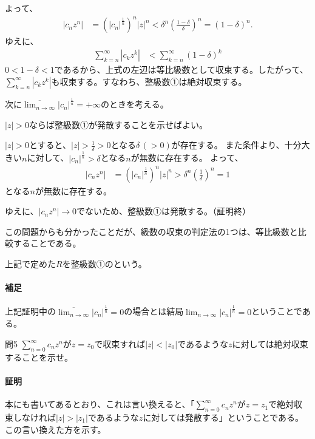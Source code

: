 よって、
\begin{align*}
    |c_nz^n|&=\left(|c_n|^\frac{1}{n}\right)^n|z|^n<\delta^n\left(\frac{1-\delta}{\delta}\right)^n
    =(1-\delta)^n.
\end{align*}
ゆえに、
\begin{align*}
    \sum_{k=n}^\infty |c_kz^k|&<\sum_{k=n}^\infty(1-\delta)^k
\end{align*}
$0<1-\delta<1$であるから、上式の左辺は等比級数として収束する。したがって、$\sum_{k=n}^\infty |c_kz^k|$も収束する。すなわち、整級数①は絶対収束する。

次に$\displaystyle\overline{\lim_{n\to\infty}}|c_n|^{\frac{1}{n}}=+\infty$のときを考える。

$|z|>0$ならば整級数①が発散することを示せばよい。

$|z|>0$とすると、$|z|>\frac{1}{\delta}>0$となる$\delta\,(>0)$が存在する。
また条件より、十分大きい$n$に対して、$|c_n|^\frac{1}{n}>\delta$となる$n$が無数に存在する。
よって、
\begin{align*}
    |c_nz^n|&=\left(|c_n|^\frac{1}{n}\right)^n|z|^n>\delta^n\left(\frac{1}{\delta}\right)^n
    =1
\end{align*}
となる$n$が無数に存在する。

ゆえに、$|c_nz^n|\to 0$でないため、整級数①は発散する。（証明終）

この問題からも分かったことだが、級数の収束の判定法の1つは、等比級数と比較することである。

上記で定めた$R$を整級数①のという。

\paragraph{補足}
上記証明中の$\displaystyle\overline{\lim_{n\to\infty}}|c_n|^{\frac{1}{n}}=0$の場合とは結局$\displaystyle{\lim_{n\to\infty}|c_n|^{\frac{1}{n}}=0}$ということである。

\begin{mysimplebox}{問5}
    $\sum_{n=0}^\infty c_nz^n$が$z=z_0$で収束すれば$|z|<|z_0|$であるような$z$に対しては絶対収束することを示せ。
\end{mysimplebox}
\paragraph{証明}
本にも書いてあるとおり、これは言い換えると、「$\sum_{n=0}^\infty c_nz^n$が$z=z_1$で絶対収束しなければ$|z|>|z_1|$であるような$z$に対しては発散する」ということである。この言い換えた方を示す。

